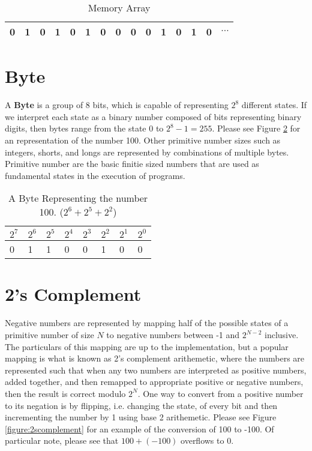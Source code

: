 \documentclass[12pt, letterpaper]{book}
\begin{document}
\begin{table}[h]
\centering
\begin{tabular}{|l|l|l|l|l|l|l|l|l|l|l|l|l|l|l|}
\hline
0 & 1 & 0 & 1 & 0 & 1 & 0 & 0 & 0 & 0 & 1 & 0 & 1 & 0 & $\cdots$\\ \hline
\end{tabular}
\caption{Memory Array}
\label{figure:memory}
\end{table}

\section{Byte}
	A \textbf{Byte} is a group of 8 bits, which is capable of representing $2^{8}$ different states. If we interpret each state as a binary number composed of bits representing binary digits, then bytes range from the state 0 to $2^{8} - 1 = 255$. Please see Figure \ref{figure:byte100} for an representation of the number 100. Other primitive number sizes such as integers, shorts, and longs are represented by combinations of multiple bytes. Primitive number are the basic finitie sized numbers that are used as fundamental states in the execution of programs. 

\begin{table}[h]
\centering
\begin{tabular}{llllllll}
$2^{7}$ & $2^{6}$ & $2^{5}$ & $2^{4}$    & $2^{3}$   & $2^{2}$  & $2^{1}$ & $2^{0}$ \\ \hline
\multicolumn{1}{|l|}{0} & \multicolumn{1}{l|}{1} & \multicolumn{1}{l|}{1} & \multicolumn{1}{l|}{0} & \multicolumn{1}{l|}{0} & \multicolumn{1}{l|}{1} & \multicolumn{1}{l|}{0} & \multicolumn{1}{l|}{0} \\ \hline
\end{tabular}
\caption{A Byte Representing the number 100. ($2^{6} + 2^{5} + 2^{2}$)}
\label{figure:byte100}
\end{table}

\section{2's Complement}
Negative numbers are represented by mapping half of the possible states of a primitive number of size $N$ to negative numbers between -1 and $2^{N-2}$ inclusive. The particulars of this mapping are up to the implementation, but a popular mapping is what is known as 2's complement arithemetic, where the numbers are represented such that when any two numbers are interpreted as positive numbers, added together, and then remapped to appropriate positive or negative numbers, then the result is correct modulo $2^{N}$. One way to convert from a positive number to its negation is by flipping, i.e. changing the state, of every bit and then incrementing the number by 1 using base 2 arithemetic. Please see Figure \ref{figure:2scomplement} for an example of the conversion of 100 to -100. Of particular note, please see that $100 + (-100)$ overflows to 0.
\end{document}
